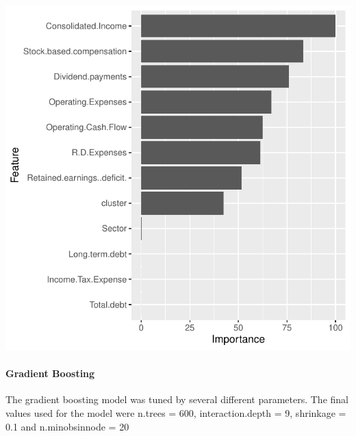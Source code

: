 \documentclass[11pt,]{article}
\begin{document}
\begin{center}\includegraphics{stock_analysis_files/figure-latex/Lasso regression-1} \end{center}

\hypertarget{gradient-boosting}{%
\paragraph{\texorpdfstring{\textbf{Gradient Boosting}\\
}{Gradient Boosting }}\label{gradient-boosting}}

The gradient boosting model was tuned by several different parameters.
The final values used for the model were n.trees = 600,
interaction.depth = 9, shrinkage = 0.1 and n.minobsinnode = 20
\end{document}
